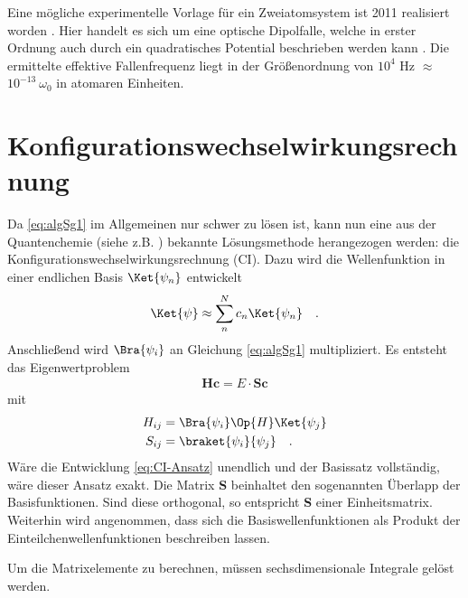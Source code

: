 %
%
Eine mögliche experimentelle Vorlage für ein Zweiatomsystem ist 2011  
realisiert worden \cite{av:7a}.
 Hier handelt es sich um eine
optische Dipolfalle, welche in erster Ordnung auch durch ein quadratisches
Potential beschrieben werden kann  \cite{phdthesis:sala}.  Die ermittelte 
effektive Fallenfrequenz liegt in der Größenordnung von
$10^{4}$ Hz $\approx$ $10^{-13}\ \omega_0$ in atomaren Einheiten. 
% 
\pagebreak
%
%
%
\section{Konfigurationswechselwirkungsrechnung}
%
Da \ref{eq:algSg1} im Allgemeinen nur schwer zu lösen ist, kann nun eine aus der
Quantenchemie (siehe z.B. \cite{b:3a}) bekannte Lösungsmethode herangezogen 
werden:
die Konfigurationswechselwirkungsrechnung (CI). Dazu wird die Wellenfunktion in 
einer endlichen Basis $\Ket{\psi_n}$  
entwickelt    
%
\begin{align}\label{eq:CI-Ansatz}
	\Ket{\psi} \approx \sum_n^N c_n \Ket{\psi_n} \quad.
\end{align}
%
Anschließend wird $\Bra{\psi_i}$ an Gleichung \ref{eq:algSg1} multipliziert. Es 
entsteht das 
Eigenwertproblem
%
\begin{align}\label{eq:EWP}
	\textbf{H}\textbf{c}=E\cdot \textbf{S}\textbf{c}
\end{align}
%
mit 
%
\begin{align}\label{eq:Matrixelemente}
	H_{ij}&=\Bra{\psi_i} \Op{H}\Ket{\psi_j}\\
	S_{ij}&=\braket{\psi_i}{\psi_j} \quad .
\end{align}
%
Wäre die Entwicklung \ref{eq:CI-Ansatz} unendlich und der Basissatz vollständig,
wäre dieser Ansatz exakt. Die Matrix \textbf{S} beinhaltet den sogenannten 
Überlapp der Basisfunktionen. Sind diese orthogonal, so entspricht \textbf{S} 
einer Einheitsmatrix.  Weiterhin wird angenommen, dass sich die 
Basiswellenfunktionen als Produkt der 
Einteilchenwellenfunktionen
beschreiben lassen.

Um die Matrixelemente zu berechnen, müssen 
sechsdimensionale Integrale gelöst werden.%
%
%
%
